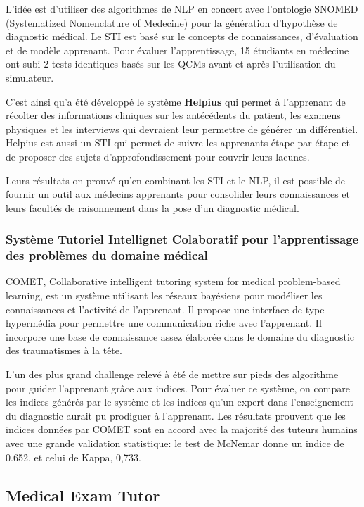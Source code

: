 L'idée est d'utiliser des algorithmes de NLP en concert avec l'ontologie SNOMED (Systematized Nomenclature of Medecine) pour la génération d'hypothèse de diagnostic médical. Le STI est basé sur le concepts de connaissances, d'évaluation et de modèle apprenant. Pour évaluer l'apprentissage, 15 étudiants en médecine ont subi 2 tests identiques  basés sur les QCMs avant et après l'utilisation du simulateur.

C'est ainsi qu'a été développé le système \textbf{Helpius} qui permet à l'apprenant de récolter des informations cliniques sur les antécédents du patient, les examens physiques et les interviews qui devraient leur permettre de générer un différentiel. Helpius est aussi un STI qui permet de suivre les apprenants étape par étape et de proposer des sujets d'approfondissement pour couvrir leurs lacunes.

Leurs résultats on prouvé qu'en combinant les STI et le NLP, il est possible de fournir un outil aux médecins apprenants pour consolider leurs connaissances et leurs facultés de raisonnement dans la pose d'un diagnostic médical.

\subsubsection{Système Tutoriel Intellignet Colaboratif pour l'apprentissage des problèmes du domaine médical}
COMET, Collaborative intelligent tutoring system for medical problem-based learning, est un système utilisant les réseaux bayésiens pour modéliser les connaissances et l'activité de l'apprenant. Il propose une interface de type hypermédia pour permettre une communication riche avec l'apprenant. Il incorpore une base de connaissance assez élaborée dans le domaine du diagnostic des traumatismes à la tête.

L'un des plus grand challenge relevé à été de mettre sur pieds des algorithme pour guider l'apprenant grâce aux indices. Pour évaluer ce système, on compare les indices générés par le système et les indices qu'un expert dans l'enseignement du diagnostic aurait pu prodiguer à l'apprenant. Les résultats prouvent que les indices données par COMET sont en accord avec la majorité des tuteurs humains avec une grande validation statistique: le test de McNemar donne un indice de 0.652, et celui de Kappa, 0,733.

\subsection{Medical Exam Tutor}

